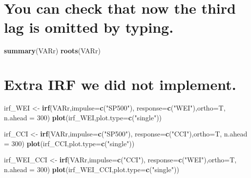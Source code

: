 \documentclass[]{article}
\newenvironment{Shaded}{\begin{snugshade}}{\end{snugshade}}
\newcommand{\KeywordTok}[1]{\textcolor[rgb]{0.13,0.29,0.53}{\textbf{#1}}}
\newcommand{\DataTypeTok}[1]{\textcolor[rgb]{0.13,0.29,0.53}{#1}}
\newcommand{\DecValTok}[1]{\textcolor[rgb]{0.00,0.00,0.81}{#1}}
\newcommand{\StringTok}[1]{\textcolor[rgb]{0.31,0.60,0.02}{#1}}
\newcommand{\NormalTok}[1]{#1}
\begin{document}
\section{You can check that now the third lag is omitted by
typing.}\label{you-can-check-that-now-the-third-lag-is-omitted-by-typing.}

\begin{Shaded}
\begin{Highlighting}[]
\KeywordTok{summary}\NormalTok{(VARr)}
\KeywordTok{roots}\NormalTok{(VARr)}
\end{Highlighting}
\end{Shaded}

\section{Extra IRF we did not
implement.}\label{extra-irf-we-did-not-implement.}

\begin{Shaded}
\begin{Highlighting}[]
\NormalTok{irf_WEI <-}\StringTok{ }\KeywordTok{irf}\NormalTok{(VARr,}\DataTypeTok{impulse=}\KeywordTok{c}\NormalTok{(}\StringTok{"SP500"}\NormalTok{),}
               \DataTypeTok{response=}\KeywordTok{c}\NormalTok{(}\StringTok{"WEI"}\NormalTok{),}\DataTypeTok{ortho=}\NormalTok{T, }\DataTypeTok{n.ahead =} \DecValTok{300}\NormalTok{)}
\KeywordTok{plot}\NormalTok{(irf_WEI,}\DataTypeTok{plot.type=}\KeywordTok{c}\NormalTok{(}\StringTok{"single"}\NormalTok{))}

\NormalTok{irf_CCI <-}\StringTok{ }\KeywordTok{irf}\NormalTok{(VARr,}\DataTypeTok{impulse=}\KeywordTok{c}\NormalTok{(}\StringTok{"SP500"}\NormalTok{),}
               \DataTypeTok{response=}\KeywordTok{c}\NormalTok{(}\StringTok{"CCI"}\NormalTok{),}\DataTypeTok{ortho=}\NormalTok{T, }\DataTypeTok{n.ahead =} \DecValTok{300}\NormalTok{)}
\KeywordTok{plot}\NormalTok{(irf_CCI,}\DataTypeTok{plot.type=}\KeywordTok{c}\NormalTok{(}\StringTok{"single"}\NormalTok{))}

\NormalTok{irf_WEI_CCI <-}\StringTok{ }\KeywordTok{irf}\NormalTok{(VARr,}\DataTypeTok{impulse=}\KeywordTok{c}\NormalTok{(}\StringTok{"CCI"}\NormalTok{),}
                   \DataTypeTok{response=}\KeywordTok{c}\NormalTok{(}\StringTok{"WEI"}\NormalTok{),}\DataTypeTok{ortho=}\NormalTok{T, }\DataTypeTok{n.ahead =} \DecValTok{300}\NormalTok{)}
\KeywordTok{plot}\NormalTok{(irf_WEI_CCI,}\DataTypeTok{plot.type=}\KeywordTok{c}\NormalTok{(}\StringTok{"single"}\NormalTok{))}
\end{Highlighting}
\end{Shaded}
\end{document}
